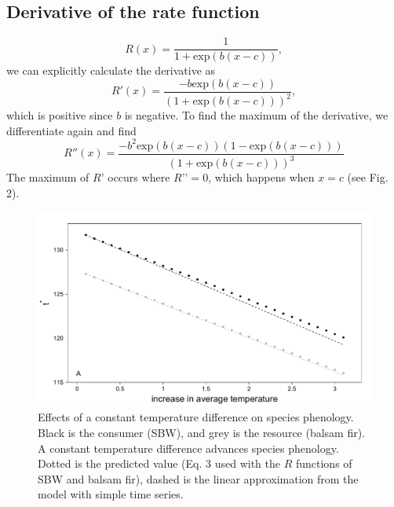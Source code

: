 \documentclass[12 pt]{article}
\begin{document}
\subsection*{Derivative of the rate function}
\begin{equation}
    R(x)=\frac{1}{1+\mathrm{exp}(b(x-c))}, \tag*{Eq. S\theequation}
\end{equation}
we can explicitly calculate the derivative as
\begin{equation}
    R'(x)=\frac{-b \mathrm{exp}(b(x-c))}{(1+\mathrm{exp}(b(x-c)))^2}, \tag*{Eq. S\theequation}
\end{equation}
which is positive since $b$ is negative. To find the maximum of the derivative, we differentiate again and find
\begin{equation}
    R''(x) = \frac{-b^2 \mathrm{exp}(b(x-c))(1-\mathrm{exp}(b(x-c)))}{(1+\mathrm{exp}(b(x-c)))^3} \tag*{Eq. S\theequation}
\end{equation}
The maximum of $R’$ occurs where $R’’ = 0$, which happens when $x = c$ (see Fig. 2).

\clearpage
\begin{figure}[ht]
\begin{center}
\renewcommand{\thefigure}{S\arabic{figure}}
\setcounter{figure}{0}
\includegraphics[width = 16 cm, keepaspectratio]{FigureS1}
\caption{\doublespacing Effects of a constant temperature difference on species phenology. Black is the consumer (SBW), and grey is the resource (balsam fir). A constant temperature difference advances species phenology. Dotted is the predicted value (Eq. 3 used with the $R$ functions of SBW and balsam fir), dashed is the linear approximation from the model with simple time series.}
\end{center}
\end{figure}
\end{document}
